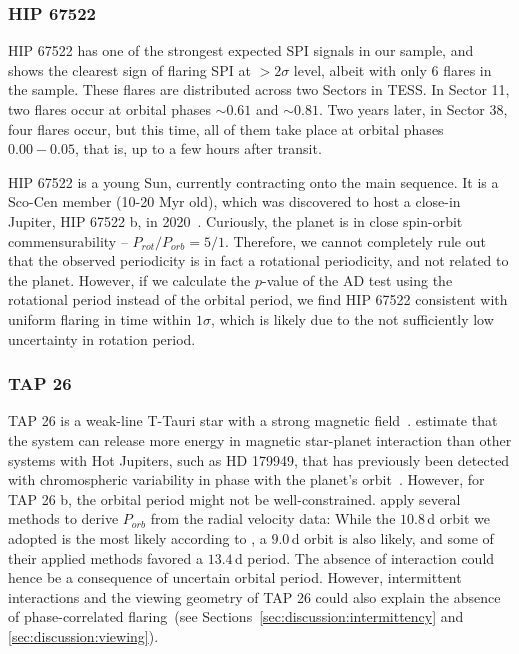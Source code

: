 \documentclass[twocolumn]{aastex631}
\begin{document}
\subsubsection{HIP 67522}
\label{sec:results:individualstars:hip67522}
HIP 67522 has one of the strongest expected SPI signals in our sample, and shows the clearest sign of flaring SPI at $>2\sigma$ level, albeit with only 6 flares in the sample. These flares are distributed across two Sectors in TESS. In Sector 11, two flares occur at orbital phases $\sim 0.61$ and $\sim 0.81$. Two years later, in Sector 38, four flares occur, but this time, all of them take place at orbital phases $0.00-0.05$, that is, up to a few hours after transit.

HIP 67522 is a young Sun, currently contracting onto the main sequence. It is a Sco-Cen member (10-20 Myr old), which was discovered to host a close-in Jupiter, HIP 67522 b, in 2020~\citep{rizzuto2020tess}. Curiously, the planet is in close spin-orbit commensurability -- $P_{rot}/P_{orb}=5/1$. Therefore, we cannot completely rule out that the observed periodicity is in fact a rotational periodicity, and not related to the planet. However, if we calculate the $p$-value of the AD test using the rotational period instead of the orbital period, we find HIP 67522 consistent with uniform flaring in time within $1\sigma$, which is likely due to the not sufficiently low uncertainty in rotation period.%


\subsubsection{TAP 26}
\label{sec:results:individualstars:tap26}
TAP 26 is a weak-line T-Tauri star with a strong magnetic field~\citep{yu2017hot}. \citet{lanza2018closeby} estimate that the system can release more energy in magnetic star-planet interaction than other  systems with Hot Jupiters, such as HD 179949, that has previously been detected with chromospheric variability in phase with the planet's orbit~\citep{shkolnik2008nature}. However, for TAP 26 b, the orbital period might not be well-constrained. \citet{yu2017hot} apply several methods to derive $P_{orb}$ from the radial velocity data: While the $10.8\,$d orbit we adopted is the most likely according to \citet{yu2017hot}, a $9.0\,$d orbit is also likely, and some of their applied methods favored a $13.4\,$d period. The absence of interaction could hence be a consequence of uncertain orbital period. However, intermittent interactions and the viewing geometry of TAP 26 could also explain the absence of phase-correlated flaring~(see Sections~\ref{sec:discussion:intermittency} and \ref{sec:discussion:viewing}).
\end{document}
